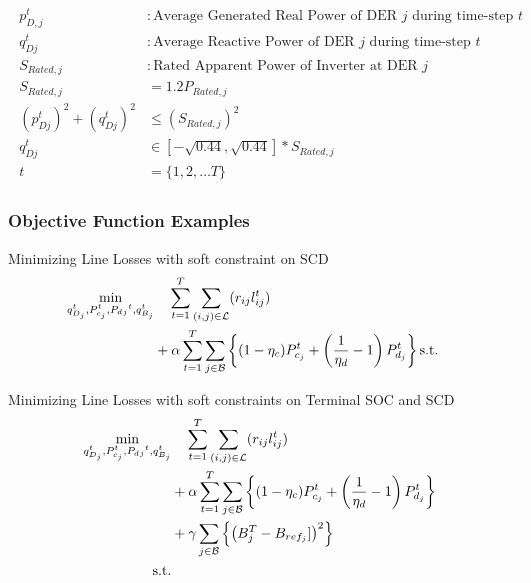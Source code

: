 \begin{gather}
	\begin{align}
		{p^t_{D,j}} &: {\text{Average Generated Real Power of DER $j$ during time-step $t$}} \nonumber\\
		{q^t_{Dj}} &: {\text{Average Reactive Power of DER $j$ during time-step $t$ }} \nonumber\\
		{S_{Rated, j}} &: {\text{Rated Apparent Power of Inverter at DER $j$}} \nonumber\\
		{S_{Rated,j}} &= {1.2P_{Rated,j}} \\
		{ (p^t_{Dj})^2 + (q^t_{Dj})^2} &\leq {(S_{Rated,j})^2} \\
		{q^t_{Dj}} &\in {[-\sqrt{0.44}, \sqrt{0.44}]*S_{Rated,j}} \\
		{t} &= {\{1, 2, \ldots T\}}\nonumber
	\end{align}
\end{gather}

\subsubsection{Objective Function Examples}

Minimizing Line Losses with soft constraint on SCD
\begin{gather}
	\begin{align}
		\min_{
		\substack{
		q_{D_j}^t, P_{c_j}^t, P_d{_j}^t, q_{B_j}^t}
		} 
		\vspace{-15ex} %
		& \quad
		\sum_{t = 1}^{T} \sum_{(i, j) \in \mathcal{L}} (r_{ij}l_{ij}^t) \\
		&+ \alpha \sum_{t = 1}^{T} \sum_{j \in \mathcal{B}} \left\{ (1- \eta_c)P_{c_j}^t + \left(\frac{1}{\eta_d}-1\right) P_{d_j}^t \right\} \nonumber
		\text{s.t.} & {}\nonumber
	\end{align}
\end{gather}

Minimizing Line Losses with soft constraints on Terminal SOC and SCD
\begin{gather}
	\begin{align}
		\min_{
		\substack{
		q_{D_j}^t, P_{c_j}^t, P_d{_j}^t, q_{B_j}^t}
		} 
		\vspace{-15ex} %
		& \quad
		\sum_{t = 1}^{T} \sum_{(i, j) \in \mathcal{L}} (r_{ij}l_{ij}^t) \\
		&+ \alpha \sum_{t = 1}^{T} \sum_{j \in \mathcal{B}} \left\{ (1- \eta_c)P_{c_j}^t + \left(\frac{1}{\eta_d}-1\right) P_{d_j}^t \right\} \nonumber\\
		&+ \gamma \sum_{j \in \mathcal{B}} \left\{ \left(B^{T}_{j} - B_{ref_{j}}]\right)^2\right\} \nonumber\\
		\text{s.t.} & {}\nonumber
	\end{align}
\end{gather}

